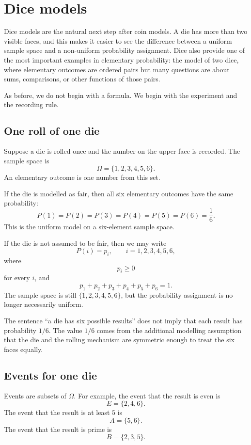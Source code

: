\section{Dice models}

Dice models are the natural next step after coin models. A die has more than two
visible faces, and this makes it easier to see the difference between a uniform
sample space and a non-uniform probability assignment. Dice also provide one of
the most important examples in elementary probability: the model of two dice,
where elementary outcomes are ordered pairs but many questions are about sums,
comparisons, or other functions of those pairs.

As before, we do not begin with a formula. We begin with the experiment and the
recording rule.

\subsection*{One roll of one die}

Suppose a die is rolled once and the number on the upper face is recorded. The
sample space is
\[
\Omega=\{1,2,3,4,5,6\}.
\]
An elementary outcome is one number from this set.

If the die is modelled as fair, then all six elementary outcomes have the same
probability:
\[
P(1)=P(2)=P(3)=P(4)=P(5)=P(6)=\frac16.
\]
This is the uniform model on a six-element sample space.

If the die is not assumed to be fair, then we may write
\[
P(i)=p_i,\qquad i=1,2,3,4,5,6,
\]
where
\[
p_i\geq 0
\]
for every \(i\), and
\[
p_1+p_2+p_3+p_4+p_5+p_6=1.
\]
The sample space is still \(\{1,2,3,4,5,6\}\), but the probability assignment is
no longer necessarily uniform.

\begin{remarkbox}
The sentence ``a die has six possible results'' does not imply that each result
has probability \(1/6\). The value \(1/6\) comes from the additional modelling
assumption that the die and the rolling mechanism are symmetric enough to treat
the six faces equally.
\end{remarkbox}

\subsection*{Events for one die}

Events are subsets of \(\Omega\). For example, the event that the result is even
is
\[
E=\{2,4,6\}.
\]
The event that the result is at least \(5\) is
\[
A=\{5,6\}.
\]
The event that the result is prime is
\[
B=\{2,3,5\}.
\]


